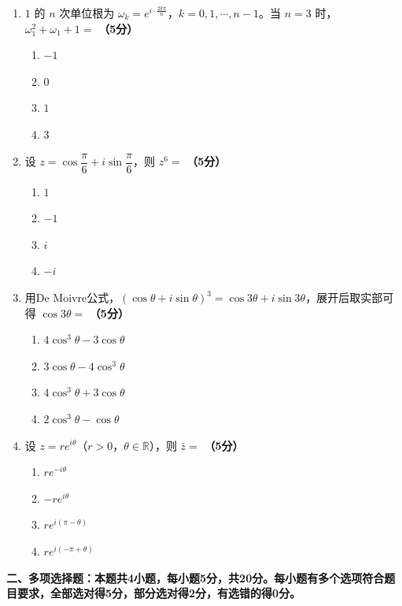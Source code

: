 \documentclass[12pt, a4paper]{ctexart}
\newcommand{\score}[1]{\hfill\textbf{（#1分）}}
\begin{document}
\begin{enumerate}
\item $1$ 的 $n$ 次单位根为 $\omega_k=e^{i\cdot\frac{2k\pi}{n}}$，$k=0,1,\cdots,n-1$。当 $n=3$ 时，$\omega_1^2+\omega_1+1=$ \score{5}
\begin{enumerate}[label=\Alph*.]
    \item $-1$
    \item $0$
    \item $1$
    \item $3$
\end{enumerate}

\item 设 $z=\cos\dfrac{\pi}{6}+i\sin\dfrac{\pi}{6}$，则 $z^6=$ \score{5}
\begin{enumerate}[label=\Alph*.]
    \item $1$
    \item $-1$
    \item $i$
    \item $-i$
\end{enumerate}

\item 用De Moivre公式，$(\cos\theta+i\sin\theta)^3=\cos 3\theta+i\sin 3\theta$，展开后取实部可得 $\cos 3\theta=$ \score{5}
\begin{enumerate}[label=\Alph*.]
    \item $4\cos^3\theta-3\cos\theta$
    \item $3\cos\theta-4\cos^3\theta$
    \item $4\cos^3\theta+3\cos\theta$
    \item $2\cos^3\theta-\cos\theta$
\end{enumerate}

\item 设 $z=re^{i\theta}$（$r>0$，$\theta\in\mathbb{R}$），则 $\bar{z}=$ \score{5}
\begin{enumerate}[label=\Alph*.]
    \item $re^{-i\theta}$
    \item $-re^{i\theta}$
    \item $re^{i(\pi-\theta)}$
    \item $re^{i(-\pi+\theta)}$
\end{enumerate}

\end{enumerate}

\vspace{10pt}

{\large\bfseries 二、多项选择题：本题共4小题，每小题5分，共20分。每小题有多个选项符合题目要求，全部选对得5分，部分选对得2分，有选错的得0分。}
\end{document}
